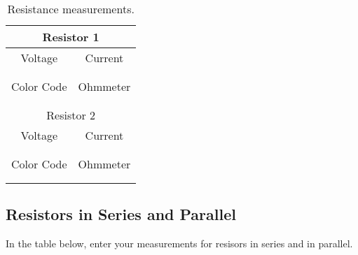 \begin{table}[htb]
\begin{center}
\begin{tabular}{|c|c|}
\hline
\multicolumn{2}{|c|}{Resistor 1} \\
\hline 
Voltage & Current  \\ 
\hline
\hspace*{3cm} & \hspace*{3cm}  \\ 
&  \\ 
\hline
Color Code & Ohmmeter  \\ 
\hline
&   \\
&   \\
\hline
\hline
\multicolumn{2}{|c|}{Resistor 2} \\
\hline 

Voltage & Current  \\
\hline
\hspace*{3cm} & \hspace*{3cm}  \\ 
&  \\ 
\hline

Color Code & Ohmmeter  \\ 
\hline
&  \\
&   \\
\hline
\end{tabular}
\end{center}
\caption{Resistance measurements.}
\label{tab:DC:resistmeas}
\end{table}

\newpage
\subsection{Resistors in Series and Parallel}

\noindent
In the table below, enter your measurements for resisors in
series and in parallel. 

